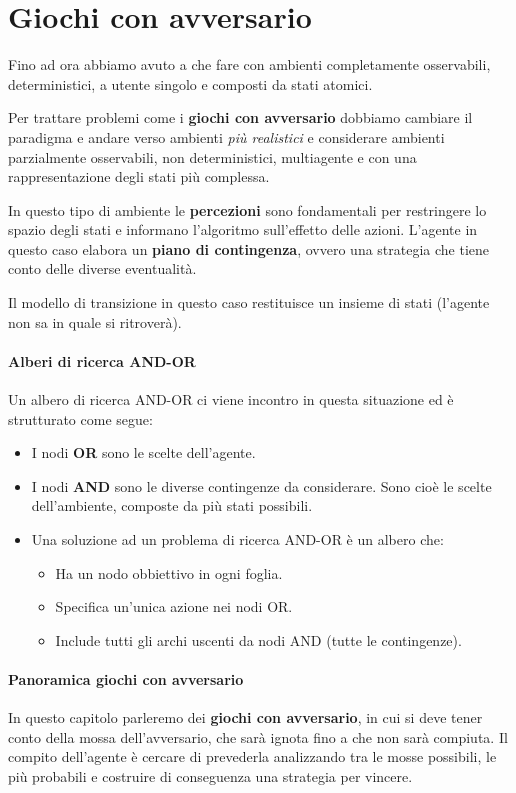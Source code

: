 \chapter{Giochi con avversario}
Fino ad ora abbiamo avuto a che fare con ambienti completamente osservabili, deterministici, a utente singolo e
composti da stati atomici.

Per trattare problemi come i \textbf{giochi con avversario} dobbiamo cambiare il paradigma e andare verso ambienti
\emph{pi\`u realistici} e considerare ambienti parzialmente osservabili, non deterministici, multiagente e con una
rappresentazione degli stati pi\`u complessa.

In questo tipo di ambiente le \textbf{percezioni} sono fondamentali per restringere lo spazio degli stati e informano
l'algoritmo sull'effetto delle azioni. L'agente in questo caso elabora un \textbf{piano di contingenza}, ovvero una
strategia che tiene conto delle diverse eventualit\`a.

Il modello di transizione in questo caso restituisce un insieme di stati (l'agente non sa in quale si ritrover\`a).

\subsubsection{Alberi di ricerca AND-OR}
Un albero di ricerca AND-OR ci viene incontro in questa situazione ed \`e strutturato come segue:
\begin{itemize}
	\item I nodi \textbf{OR} sono le scelte dell'agente.
	\item I nodi \textbf{AND} sono le diverse contingenze da considerare. Sono cio\`e le scelte dell'ambiente, composte
	      da pi\`u stati possibili.
	\item Una soluzione ad un problema di ricerca AND-OR \`e un albero che:
	      \begin{itemize}
		      \item Ha un nodo obbiettivo in ogni foglia.
		      \item Specifica un'unica azione nei nodi OR.
		      \item Include tutti gli archi uscenti da nodi AND (tutte le contingenze).
	      \end{itemize}
\end{itemize}

\subsubsection{Panoramica giochi con avversario}
In questo capitolo parleremo dei \textbf{giochi con avversario}, in cui si deve tener conto della mossa dell'avversario,
che sar\`a ignota fino a che non sar\`a compiuta. Il compito dell'agente \`e cercare di prevederla analizzando tra le
mosse possibili, le pi\`u probabili e costruire di conseguenza una strategia per vincere.

